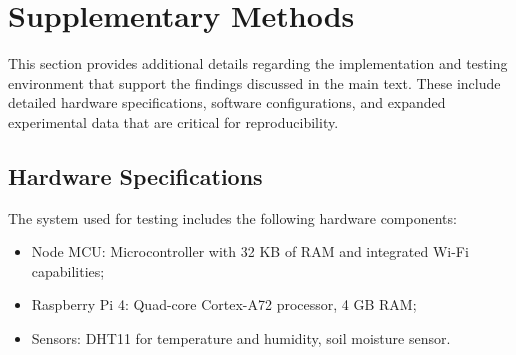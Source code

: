 \documentclass[journal]{Definitions/mdpi}
\begin{document}





\appendixstart

\appendix

\section[\appendixname~\thesection]{Supplementary Methods}
This section provides additional details regarding the implementation and testing environment that support the findings discussed in the main text. These include detailed hardware specifications, software configurations, and expanded experimental data that are critical for reproducibility.

\subsection[\appendixname~\thesubsection]{Hardware Specifications}
The system used for testing includes the following hardware components:
\begin{itemize}
\item Node MCU: Microcontroller with 32 KB of RAM and integrated Wi-Fi capabilities;
\item Raspberry Pi 4: Quad-core Cortex-A72 processor, 4 GB RAM;
\item Sensors: DHT11 for temperature and humidity, soil moisture sensor.
\end{itemize}
\end{document}
